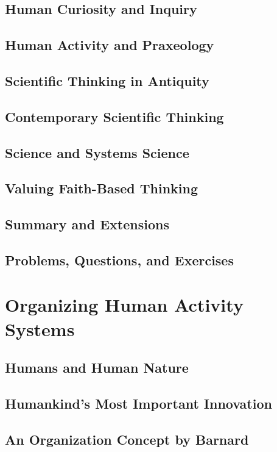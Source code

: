 \documentclass[11pt,fleqn]{book} %
\begin{document}
    \section{Human Curiosity and Inquiry}
    \section{Human Activity and Praxeology}
    \section{Scientific Thinking in Antiquity}
    \section{Contemporary Scientific Thinking}
    \section{Science and Systems Science}
	\section{Valuing Faith-Based Thinking}
	\section*{Summary and Extensions}
	\section*{Problems, Questions, and Exercises}
  
  \chapter{Organizing Human Activity Systems}
  \label{ch:organizing-human-activity}
    \section{Humans and Human Nature}
    \section{Humankind's Most Important Innovation}
    \section{An Organization Concept by Barnard}
\end{document}
